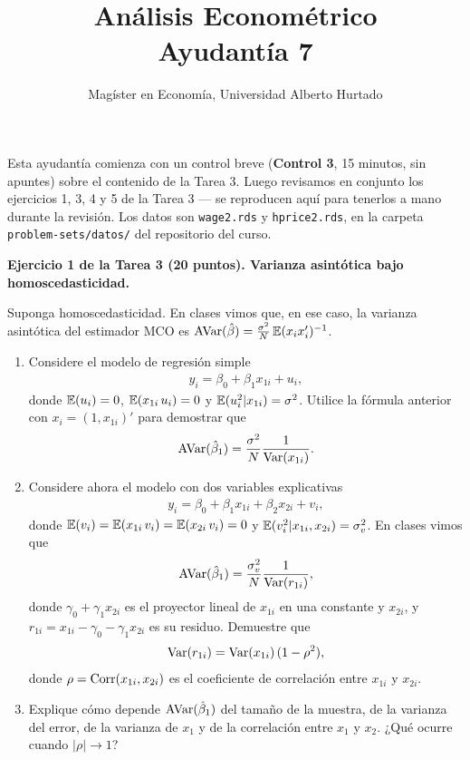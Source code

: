 \documentclass[letterpaper,11pt]{article}
\title{Análisis Econométrico \\ Ayudantía 7}
\author{Magíster en Economía, Universidad Alberto Hurtado}
\date{}
\begin{document}
\maketitle

\noindent Esta ayudantía comienza con un control breve (\textbf{Control 3}, 15 minutos, sin
apuntes) sobre el contenido de la Tarea 3. Luego revisamos en conjunto los ejercicios 1, 3, 4
y 5 de la Tarea 3 --- se reproducen aquí para tenerlos a mano durante la revisión. Los datos
son \texttt{wage2.rds} y \texttt{hprice2.rds}, en la carpeta \texttt{problem-sets/datos/} del
repositorio del curso.

\vspace{1em}

\noindent\textbf{Ejercicio 1 de la Tarea 3 (20 puntos). Varianza asintótica bajo
homoscedasticidad.}

Suponga homoscedasticidad. En clases vimos que, en ese caso, la varianza asintótica del
estimador MCO es $\operatorname{AVar}(\hat \beta)=\frac{\sigma^2}{N}\operatorname{\mathbb{E}}(x_ix_i')^{-1}$.
\begin{enumerate}
    \item Considere el modelo de regresión simple
    \begin{align*}
    y_i=\beta_0+\beta_1 x_{1i}+u_i,
    \end{align*}
    donde $\operatorname{\mathbb{E}}(u_i)=0$, $\operatorname{\mathbb{E}}(x_{1i}\, u_i)=0$ y $\operatorname{\mathbb{E}}(u_i^2|x_{1i})=\sigma^2$. Utilice la fórmula
    anterior con $x_i=(1, x_{1i})'$ para demostrar que
    \begin{align*}
    \operatorname{AVar}(\hat \beta_1)=\frac{\sigma^2}{N}\frac{1}{\operatorname{Var}(x_{1i})}.
    \end{align*}
    \item Considere ahora el modelo con dos variables explicativas
    \begin{align*}
    y_i=\beta_0+\beta_1 x_{1i}+\beta_2 x_{2i}+v_i,
    \end{align*}
    donde $\operatorname{\mathbb{E}}(v_i)=\operatorname{\mathbb{E}}(x_{1i}\,v_i)=\operatorname{\mathbb{E}}(x_{2i}\,v_i)=0$ y $\operatorname{\mathbb{E}}(v_i^2|x_{1i},x_{2i})=\sigma_v^2$. En
    clases vimos que
    \begin{align*}
    \operatorname{AVar}(\hat \beta_1)=\frac{\sigma_v^2}{N}\frac{1}{\operatorname{Var}(r_{1i})},
    \end{align*}
    donde $\gamma_0+\gamma_1x_{2i}$ es el proyector lineal de $x_{1i}$ en una constante y
    $x_{2i}$, y $r_{1i}=x_{1i}-\gamma_0-\gamma_1x_{2i}$ es su residuo. Demuestre que
    \begin{align*}
    \operatorname{Var}(r_{1i})=\operatorname{Var}(x_{1i})\,(1-\rho^2),
    \end{align*}
    donde $\rho=\operatorname{Corr}(x_{1i},x_{2i})$ es el coeficiente de correlación entre $x_{1i}$ y
    $x_{2i}$.
    \item Explique cómo depende $\operatorname{AVar}(\hat \beta_1)$ del tamaño de la muestra, de la varianza
    del error, de la varianza de $x_1$ y de la correlación entre $x_1$ y $x_2$. ¿Qué ocurre
    cuando $|\rho|\to 1$?
\end{enumerate}
\end{document}
